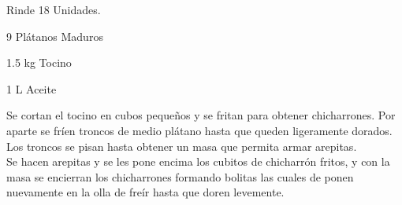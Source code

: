 
Rinde 18 Unidades.

\begin{ingredientes}
\item 9 Plátanos Maduros
\item 1.5 kg Tocino
\item 1 L Aceite 
\end{ingredientes}
\preparacion

Se cortan el tocino en cubos pequeños y se fritan para obtener chicharrones. Por aparte se fríen troncos de medio plátano hasta que queden ligeramente dorados. Los troncos se pisan hasta obtener un masa que permita armar arepitas.\\

Se hacen arepitas y se les pone encima los cubitos de chicharrón fritos, y con la masa se encierran los chicharrones formando bolitas las cuales de ponen nuevamente en la olla de freír hasta que doren levemente.\\
